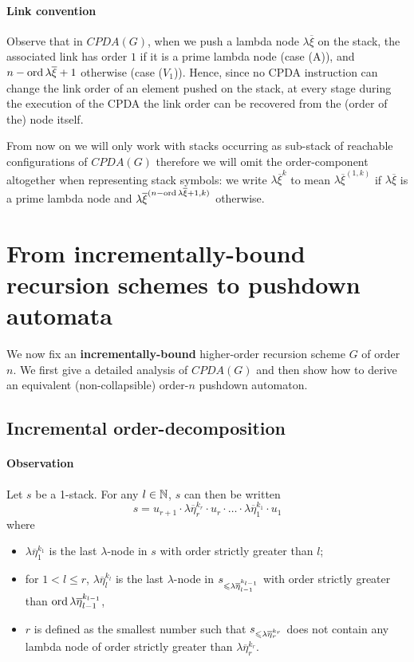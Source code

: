 \documentclass[a4paper]{article}[12pt]
\theoremstyle{remark}
\theoremstyle{definition}
\begin{document}
\paragraph{Link convention}
Observe that in $CPDA(G)$, when we push a lambda node $\lambda \overline{\xi}$ on the stack, the associated link has order $1$ if it is a prime lambda node (case (A)), and $n-\mathop{\mathrm{ord}}{\lambda \overline{\xi}}+1$ otherwise (case ($V_1$)). Hence, since no CPDA instruction can change the link order of an element pushed on the stack, at every stage during the execution of the CPDA the link order can be recovered from the (order of the) node itself.

From now on we will only work with stacks occurring as sub-stack of reachable configurations of $CPDA(G)$
therefore we will omit the order-component altogether when representing stack symbols: we write $\lambda\overline\xi^{k}$ to mean  $\lambda\overline\xi^{(1,k)}$ if $\lambda\overline\xi$ is a prime lambda node
and $\lambda\overline\xi^{(n-\mathop{\mathrm{ord}}{\lambda \overline{\xi}}+1,k)}$ otherwise.

\section{From incrementally-bound recursion schemes to pushdown automata}
\label{sec:IncrementallyBoundRSToPDA}
We now fix an {\bf incrementally-bound} higher-order recursion scheme $G$ of order $n$.
We first give a detailed analysis of $CPDA(G)$ and then show how to derive an equivalent (non-collapsible) order-$n$ pushdown automaton.

\subsection{Incremental order-decomposition}
\paragraph{Observation}
Let $s$ be a 1-stack. For any $l\in \mathbb{N}$, $s$ can then be written
$$ s = u_{r+1} \cdot \lambda \overline{\eta}_r^{k_r} \cdot u_r \cdot
\ldots \cdot \lambda \overline{\eta}_1^{k_1} \cdot  u_1 $$
where
\begin{itemize}
\item  $\lambda \overline{\eta}_1^{k_1}$ is the
last $\lambda$-node in $s$ with order strictly greater than $l$;

\item for $1 < l \leq r$, $\lambda
\overline{\eta}_l^{k_l}$ is the last $\lambda$-node in $s_{\leqslant
\lambda \overline{\eta}_{l-1}^{k_{l-1}}}$ with order strictly
greater than $\mathop{\mathrm{ord}}{\lambda \overline{\eta}_{l-1}^{k_{l-1}}}$,

\item  $r$ is defined as the smallest number such that
$s_{\leqslant \lambda \overline{\eta}_{r}^{k_{r}}}$ does not contain
any lambda node of order strictly greater than $\lambda
\overline{\eta}_{r}^{k_{r}}$.
\end{itemize}
\end{document}
